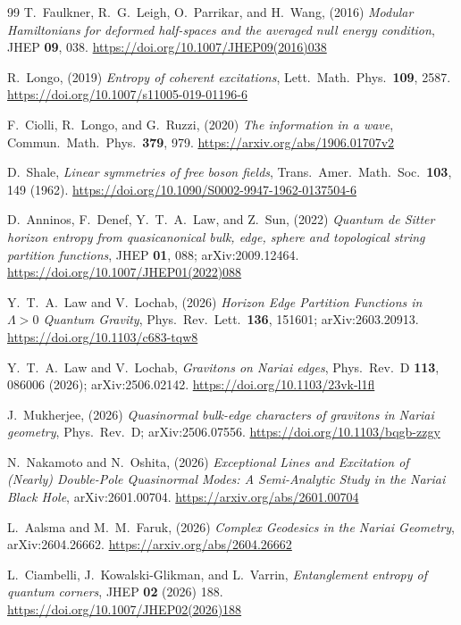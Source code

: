 \documentclass[11pt]{article}
\begin{document}
\begin{thebibliography}{99}
 T.~Faulkner, R.~G.~Leigh, O.~Parrikar, and H.~Wang, (2016) \emph{Modular Hamiltonians for deformed half-spaces and the averaged null energy condition}, JHEP \textbf{09}, 038.
\url{https://doi.org/10.1007/JHEP09(2016)038}

 R.~Longo, (2019) \emph{Entropy of coherent excitations}, Lett.\ Math.\ Phys.\ \textbf{109}, 2587.
\url{https://doi.org/10.1007/s11005-019-01196-6}

 F.~Ciolli, R.~Longo, and G.~Ruzzi, (2020) \emph{The information in a wave}, Commun.\ Math.\ Phys.\ \textbf{379}, 979. \url{https://arxiv.org/abs/1906.01707v2}

 D.~Shale, \emph{Linear symmetries of free boson fields}, Trans.\ Amer.\ Math.\ Soc.\ \textbf{103}, 149 (1962). \url{https://doi.org/10.1090/S0002-9947-1962-0137504-6}

 D.~Anninos, F.~Denef, Y.~T.~A.~Law, and Z.~Sun, (2022) \emph{Quantum de Sitter horizon entropy from quasicanonical bulk, edge, sphere and topological string partition functions}, JHEP \textbf{01}, 088; arXiv:2009.12464.
\url{https://doi.org/10.1007/JHEP01(2022)088}

 Y.~T.~A.~Law and V.~Lochab, (2026) \emph{Horizon Edge Partition Functions in $\Lambda>0$ Quantum Gravity}, Phys.\ Rev.\ Lett.\ \textbf{136}, 151601; arXiv:2603.20913.
\url{https://doi.org/10.1103/c683-tqw8}

 Y.~T.~A.~Law and V.~Lochab, \emph{Gravitons on Nariai edges}, Phys.\ Rev.\ D \textbf{113}, 086006 (2026); arXiv:2506.02142.
\url{https://doi.org/10.1103/23vk-l1fl}

 J.~Mukherjee, (2026) \emph{Quasinormal bulk-edge characters of gravitons in Nariai geometry}, Phys.\ Rev.\ D; arXiv:2506.07556.
\url{https://doi.org/10.1103/bqgb-zzgy}

 N.~Nakamoto and N.~Oshita, (2026) \emph{Exceptional Lines and Excitation of (Nearly) Double-Pole Quasinormal Modes: A Semi-Analytic Study in the Nariai Black Hole}, arXiv:2601.00704.
\newline \url{https://arxiv.org/abs/2601.00704}

 L.~Aalsma and M.~M.~Faruk, (2026) \emph{Complex Geodesics in the Nariai Geometry}, arXiv:2604.26662.
\newline \url{https://arxiv.org/abs/2604.26662}


 L.~Ciambelli, J.~Kowalski-Glikman, and L.~Varrin, \emph{Entanglement entropy of quantum corners}, JHEP \textbf{02} (2026) 188. \url{https://doi.org/10.1007/JHEP02(2026)188}


\end{thebibliography}
\end{document}
